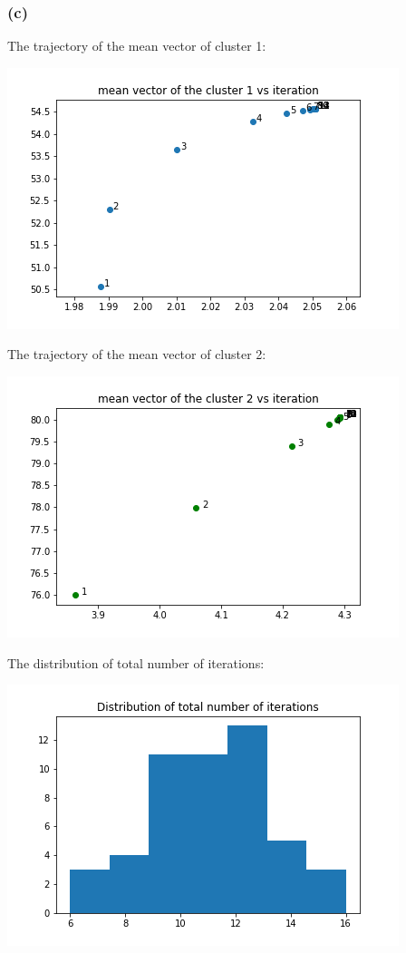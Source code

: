 \documentclass[12pt]{article}
\begin{document}
{\subsubsection*{(c)}
The trajectory of the mean vector of cluster 1: 
\begin{center}
\includegraphics[scale=0.8]{P3/mean_vector_c1.png}
\end{center}

The trajectory of the mean vector of cluster 2: 
\begin{center}
\includegraphics[scale=0.8]{P3/mean_vector_c2.png}
\end{center}

The distribution of total number of iterations:
\begin{center}
\includegraphics[scale=0.8]{P3/Histogram_iteration_number.png}
\end{center}

}
\end{document}

